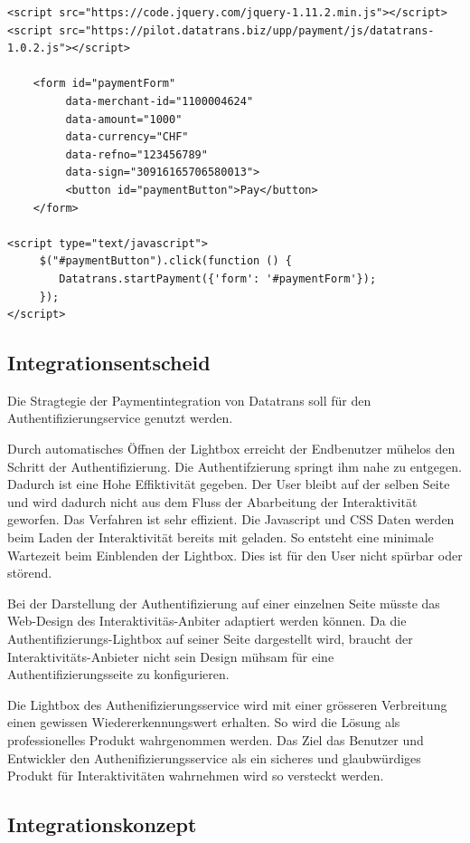 \begin{verbatim}
<script src="https://code.jquery.com/jquery-1.11.2.min.js"></script>
<script src="https://pilot.datatrans.biz/upp/payment/js/datatrans-1.0.2.js"></script>

    <form id="paymentForm"
         data-merchant-id="1100004624"
         data-amount="1000"
         data-currency="CHF"
         data-refno="123456789"
         data-sign="30916165706580013">
         <button id="paymentButton">Pay</button>
    </form>
    
<script type="text/javascript">
     $("#paymentButton").click(function () {
        Datatrans.startPayment({'form': '#paymentForm'});
     });
</script>
\end{verbatim}

\subsection{Integrationsentscheid}\label{integrationsentscheid}

Die Stragtegie der Paymentintegration von Datatrans soll für den
Authentifizierungservice genutzt werden.

Durch automatisches Öffnen der Lightbox erreicht der Endbenutzer mühelos
den Schritt der Authentifizierung. Die Authentifzierung springt ihm nahe
zu entgegen. Dadurch ist eine Hohe Effiktivität gegeben. Der User bleibt
auf der selben Seite und wird dadurch nicht aus dem Fluss der
Abarbeitung der Interaktivität geworfen. Das Verfahren ist sehr
effizient. Die Javascript und CSS Daten werden beim Laden der
Interaktivität bereits mit geladen. So entsteht eine minimale Wartezeit
beim Einblenden der Lightbox. Dies ist für den User nicht spürbar oder
störend.

Bei der Darstellung der Authentifizierung auf einer einzelnen Seite
müsste das Web-Design des Interaktivitäs-Anbiter adaptiert werden
können. Da die Authentifizierungs-Lightbox auf seiner Seite dargestellt
wird, braucht der Interaktivitäts-Anbieter nicht sein Design mühsam für
eine Authentifizierungsseite zu konfigurieren.

Die Lightbox des Authenifizierungsservice wird mit einer grösseren
Verbreitung einen gewissen Wiedererkennungswert erhalten. So wird die
Lösung als professionelles Produkt wahrgenommen werden. Das Ziel das
Benutzer und Entwickler den Authenifizierungsservice als ein sicheres
und glaubwürdiges Produkt für Interaktivitäten wahrnehmen wird so
versteckt werden.

\subsection{Integrationskonzept}\label{integrationskonzept}

